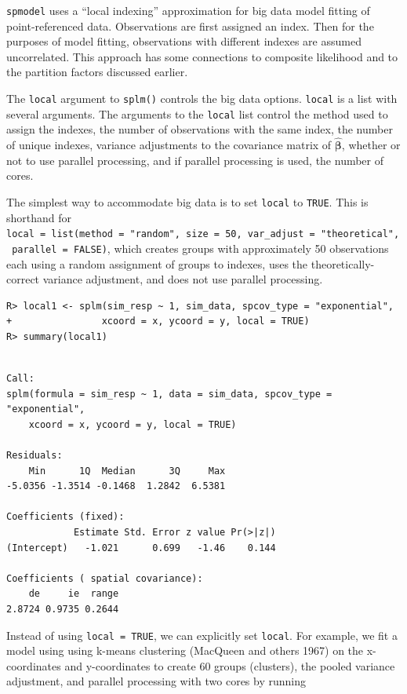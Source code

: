 \documentclass{article}
\begin{document}
\texttt{spmodel} uses a ``local indexing'' approximation for big data
model fitting of point-referenced data. Observations are first assigned
an index. Then for the purposes of model fitting, observations with
different indexes are assumed uncorrelated. This approach has some
connections to composite likelihood and to the partition factors
discussed earlier.

The \texttt{local} argument to \texttt{splm()} controls the big data
options. \texttt{local} is a list with several arguments. The arguments
to the \texttt{local} list control the method used to assign the
indexes, the number of observations with the same index, the number of
unique indexes, variance adjustments to the covariance matrix of
\(\hat{\boldsymbol{\beta}}\), whether or not to use parallel processing,
and if parallel processing is used, the number of cores.

The simplest way to accommodate big data is to set \texttt{local} to
\texttt{TRUE}. This is shorthand for
\texttt{local\ =\ list(method\ =\ "random",\ size\ =\ 50,\ var\_adjust\ =\ "theoretical",\ parallel\ =\ FALSE)},
which creates groups with approximately 50 observations each using a
random assignment of groups to indexes, uses the theoretically-correct
variance adjustment, and does not use parallel processing.

\begin{verbatim}
R> local1 <- splm(sim_resp ~ 1, sim_data, spcov_type = "exponential", 
+                xcoord = x, ycoord = y, local = TRUE)
R> summary(local1)
\end{verbatim}

\begin{verbatim}

Call:
splm(formula = sim_resp ~ 1, data = sim_data, spcov_type = "exponential", 
    xcoord = x, ycoord = y, local = TRUE)

Residuals:
    Min      1Q  Median      3Q     Max 
-5.0356 -1.3514 -0.1468  1.2842  6.5381 

Coefficients (fixed):
            Estimate Std. Error z value Pr(>|z|)
(Intercept)   -1.021      0.699   -1.46    0.144

Coefficients ( spatial covariance):
    de     ie  range 
2.8724 0.9735 0.2644 
\end{verbatim}

Instead of using \texttt{local\ =\ TRUE}, we can explicitly set
\texttt{local}. For example, we fit a model using using k-means
clustering (MacQueen and others 1967) on the x-coordinates and
y-coordinates to create 60 groups (clusters), the pooled variance
adjustment, and parallel processing with two cores by running
\end{document}
